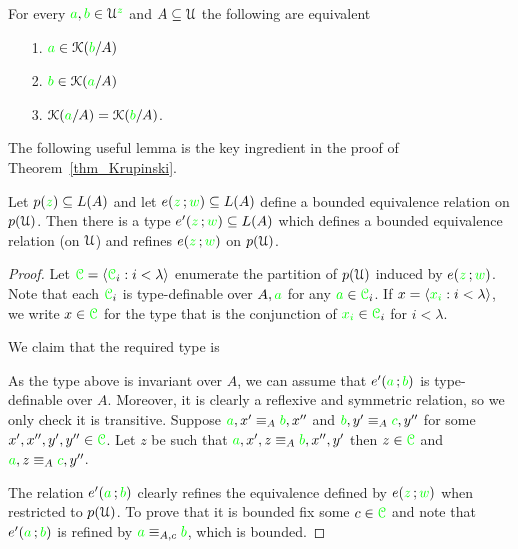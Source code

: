 \begin{corollary}\label{corol_KP_simmetry}
  For every ${\color{green} a},{\color{green} b}\in\EuScript U^{\color{green} z}$ and $A\subseteq\EuScript U$ the following are equivalent
  \begin{itemize}
  \item[1.] ${\color{green} a}\in\EuScript K({\color{green} b}/A)$
  \item[2.] ${\color{green} b}\in\EuScript K({\color{green} a}/A)$
  \item[3.] $\EuScript K({\color{green} a}/A)=\EuScript K({\color{green} b}/A)$.
  \end{itemize}
\end{corollary}

The following useful lemma is the key ingredient in the proof of Theorem~\ref{thm_Krupinski}.

\begin{lemma}\label{lem_beq_global}
  Let $p({\color{green} z})\subseteq L(A)$ and let $e({\color{green} z}\,;{\color{green} w})\subseteq L(A)$ define a bounded equivalence relation on $p(\EuScript U)$.
  Then there is a type $e'({\color{green} z}\,;{\color{green} w})\subseteq L(A)$ which defines a bounded equivalence relation (on $\EuScript U$) and refines $e({\color{green} z}\,;{\color{green} w})$ on  $p(\EuScript U)$.
\end{lemma}
\begin{proof} 
  Let ${\color{green}\EuScript C}=\langle{\color{green}\EuScript C}_i:i<\lambda\rangle$ enumerate the partition of $p(\EuScript U)$ induced by $e({\color{green} z}\,;{\color{green} w})$.
  Note that each ${\color{green}\EuScript C}_i$ is type-definable over $A,{\color{green} a}$ for any ${\color{green} a}\in{\color{green}\EuScript C}_i$.
  If $x=\langle{\color{green}x_i}:i<\lambda\rangle$, we write $x\in{\color{green}\EuScript C}$ for the type that is the conjunction of ${\color{green} x_i}\in{\color{green}\EuScript C}_i$ for $i<\lambda$. 

  We claim that the required type is 


  As the type above is invariant over $A$, we can assume that $e'({\color{green} a}\,;{\color{green} b})$ is type-definable over $A$.
  Moreover, it is clearly a reflexive and symmetric relation, so we only check it is transitive.
  Suppose ${\color{green} a},x'\equiv_A{\color{green} b},x''$ and  ${\color{green} b},y'\equiv_A{\color{green} c},y''$ for some $x',x'',y',y''\in {\color{green}\EuScript C}$.
  Let $z$ be such that ${\color{green} a},x',z\equiv_A{\color{green} b},x'',y'$ then   $z\in{\color{green}\EuScript C}$ and ${\color{green} a},z\equiv_A{\color{green} c},y''$.

  The relation $e'({\color{green} a}\,;{\color{green} b})$ clearly refines the equivalence defined by $e({\color{green} z}\,;{\color{green} w})$ when restricted to $p(\EuScript U)$.
  To prove that it is bounded fix some $c\in{\color{green}\EuScript C}$ and note that $e'({\color{green} a}\,;{\color{green} b})$  is refined by ${\color{green} a}\equiv_{A,c}{\color{green} b}$, which is bounded. 
\end{proof}

